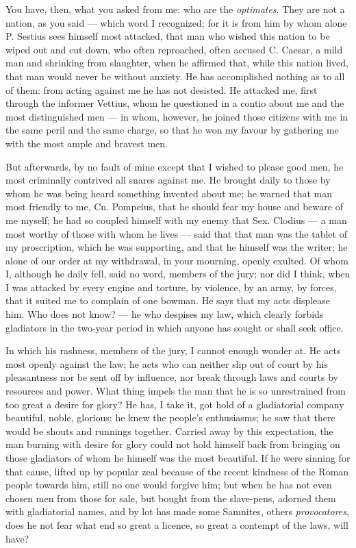  You have, then, what you asked from me: who are the \textit{optimates}. They are not a nation, as you said --- which word I recognized; for it is from him by whom alone P. Sestius sees himself most attacked, that man who wished this nation to be wiped out and cut down, who often reproached, often accused C. Caesar, a mild man and shrinking from slaughter, when he affirmed that, while this nation lived, that man would never be without anxiety. He has accomplished nothing as to all of them: from acting against me he has not desisted. He attacked me, first through the informer Vettius, whom he questioned in a contio about me and the most distinguished men --- in whom, however, he joined those citizens with me in the same peril and the same charge, so that he won my favour by gathering me with the most ample and bravest men.

 But afterwards, by no fault of mine except that I wished to please good men, he most criminally contrived all snares against me. He brought daily to those by whom he was being heard something invented about me; he warned that man most friendly to me, Cn. Pompeius, that he should fear my house and beware of me myself; he had so coupled himself with my enemy that Sex. Clodius --- a man most worthy of those with whom he lives --- said that that man was the tablet of my proscription, which he was supporting, and that he himself was the writer; he alone of our order at my withdrawal, in your mourning, openly exulted. Of whom I, although he daily fell, said no word, members of the jury; nor did I think, when I was attacked by every engine and torture, by violence, by an army, by forces, that it suited me to complain of one bowman. He says that my acts displease him. Who does not know? --- he who despises my law, which clearly forbids gladiators in the two-year period in which anyone has sought or shall seek office.

 In which his rashness, members of the jury, I cannot enough wonder at. He acts most openly against the law; he acts who can neither slip out of court by his pleasantness nor be sent off by influence, nor break through laws and courts by resources and power. What thing impels the man that he is so unrestrained from too great a desire for glory? He has, I take it, got hold of a gladiatorial company beautiful, noble, glorious; he knew the people's enthusiasms; he saw that there would be shouts and runnings together. Carried away by this expectation, the man burning with desire for glory could not hold himself back from bringing on those gladiators of whom he himself was the most beautiful. If he were sinning for that cause, lifted up by popular zeal because of the recent kindness of the Roman people towards him, still no one would forgive him; but when he has not even chosen men from those for sale, but bought from the slave-pens, adorned them with gladiatorial names, and by lot has made some Samnites, others \textit{provocatores}, does he not fear what end so great a licence, so great a contempt of the laws, will have?

